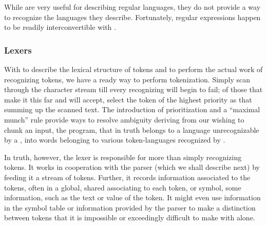 While \regexes are very useful for describing regular languages, they do not provide a way to recognize the languages they describe. Fortunately, regular expressions happen to be readily interconvertible with \FAs.

\subsubsection{Lexers}
With \regexes to describe the lexical structure of tokens and \FAs to perform the actual work of recognizing tokens, we have a ready way to perform tokenization. Simply scan through the character stream till every recognizing \FA will begin to fail; of those that make it this far and will accept, select the token of the highest priority as that summing up the scanned text. The introduction of prioritization and a ``maximal munch'' rule provide ways to resolve ambiguity deriving from our wishing to chunk an input, the program, that in truth belongs to a language unrecognizable by a \FA{}, into words belonging to various token-languages recognized by \FAs.

In truth, however, the lexer is responsible for more than simply recognizing tokens. It works in cooperation with the parser (which we shall describe next) by feeding it a stream of tokens. Further, it records information associated to the tokens, often in a global, shared  associating to each token, or symbol, some information, such as the text or value of the token. It might even use information in the symbol table or information provided by the parser to make a distinction between tokens that it is impossible or exceedingly difficult to make with \regexes alone.


